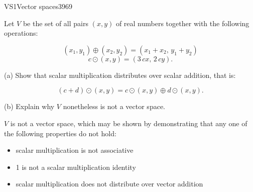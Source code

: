 \begin{exercise}{VS1}{Vector spaces}{3969} 
\begin{exerciseStatement} 

 Let \(V\) be the set of all pairs \((x,y)\) of real numbers together with the following operations: 

 \[(x_1,y_1)\oplus (x_2,y_2)=\left(x_{1} + x_{2},\,y_{1} + y_{2}\right)\]\[c \odot (x,y) =\left(3 \, c x,\,2 \, c y\right).\] 

 (a) Show that scalar multiplication distributes over scalar addition, that is: 

 \[
      (c+d)\odot(x,y)=c\odot(x,y)\oplus d\odot (x,y).
    \] 

 (b) Explain why \(V\) nonetheless is not a vector space. 

 \end{exerciseStatement}
 \begin{exerciseAnswer} 

 \(V\) is not a vector space, which may be shown by demonstrating that any one of the following properties do not hold: 

 

\begin{itemize}
\item scalar multiplication is not associative
\item 1 is not a scalar multiplication identity
\item scalar multiplication does not distribute over vector addition
\end{itemize}

     \end{exerciseAnswer}
 \end{exercise}


